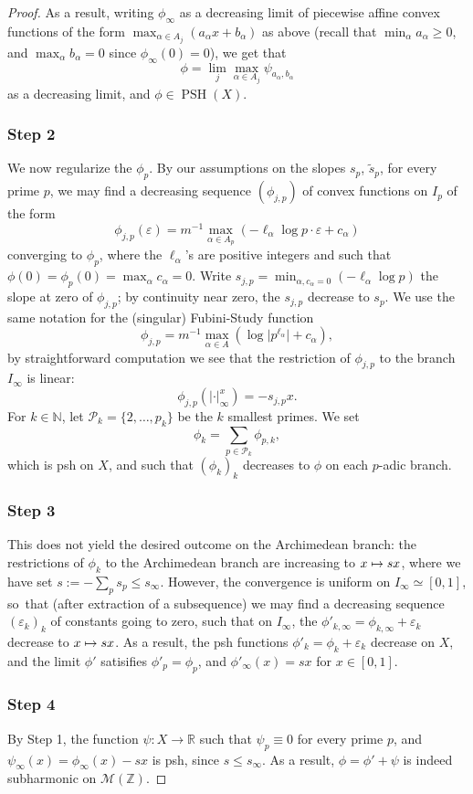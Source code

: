 \documentclass[JEP,XML,SOM,Unicode,published]{cedram}
\newcommand\mto{\mathchoice{\longmapsto}{\mapsto}{\mapsto}{\mapsto}}
\theoremstyle{definition}
\newcommand \N{\mathbb N}
\newcommand \R{\mathbb R}
\newcommand \Z{\mathbb Z}
\newcommand \M {\mathscr {M}}
\let\eps\varepsilon
\DeclareMathOperator{\PSH}{PSH}
\begin{document}
\begin{proof}
As a result, writing $\phi_{\infty}$ as a decreasing limit of piecewise affine convex functions of the form $\max_{\alpha \in A_j} (a_{\alpha} x +b_{\alpha})$ as above (recall that $\min_{\alpha} a_{\alpha} \ge 0$, and $\max_{\alpha} b_{\alpha} =0$ since $\phi_{\infty}(0)=0$), we get that
\[
\phi = \lim_j \max_{\alpha \in A_j} \psi_{a_{\alpha}, b_{\alpha}}
\]
as a decreasing limit, and $\phi \in \PSH(X)$.

\subsubsection*{Step 2} We now regularize the $\phi_p$. By our assumptions on the slopes $s_p$, $\tilde{s}_p$, for every prime $p$, we may find a decreasing sequence $(\phi_{j,p})$ of convex functions on $I_p$ of the form
\[
\phi_{j,p}(\eps) = m^{-1} \max_{\alpha \in A_p} (-\ell_{\alpha} \log p \cdot \eps +c_{\alpha})
\]
converging to $\phi_p$, where the $\ell_{\alpha}$'s are positive integers and such that $\phi(0) =\phi_p(0) = \max_{\alpha} c_{\alpha} =0$. Write $s_{j, p} = \min_{\alpha, c_{\alpha} =0} (-\ell_{\alpha} \log p)$ the slope at zero of $\phi_{j, p}$; by continuity near zero, the $s_{j, p}$ decrease to $s_p$. We use the same notation for the (singular) Fubini-Study function
\[
\phi_{j, p} =m^{-1} \max_{\alpha \in A} (\log \lvert p^{\ell_{\alpha}} \rvert +c_{\alpha}),
\]
by straightforward computation we see that the restriction of $\phi_{j, p}$ to the branch $I_{\infty}$ is linear:
\[
\phi_{j, p}(\lvert \cdot \rvert^x_{\infty}) = -s_{j, p} x.
\]
For $k \in \N$, let $\mathcal{P}_k =\{ 2,\dots,p_k \}$ be the $k$ smallest primes. We set
\[
\phi_{k} = \sum_{p \in \mathcal{P}_k} \phi_{p, k},
\]
which is psh on $X$, and such that $(\phi_k)_k$ decreases to $\phi$ on each $p$-adic branch.

\subsubsection*{Step 3} This does not yield the desired outcome on the Archimedean branch: the restrictions of $\phi_k$ to the Archimedean branch are increasing to $x \mto s x$, where we have set $s:= - \sum_{p} s_p \le s_{\infty}$. However, the convergence is uniform on $I_{\infty} \simeq [0,1]$, so~that (after extraction of a subsequence) we may find a decreasing sequence $(\eps_k)_k$ of constants going to zero, such that on $I_{\infty}$, the $\phi'_{k, \infty} = \phi_{k, \infty} + \eps_k$ decrease to $x \mto sx$. As a result, the psh functions $\phi'_k = \phi_k + \eps_k$ decrease on $X$, and the limit $\phi'$ satisifies $\phi'_p = \phi_p$, and $\phi'_{\infty}(x) = sx$ for $x \in [0,1]$.

\subsubsection*{Step 4} By Step 1, the function $\psi: X \to \R$ such that $\psi_p \equiv 0$ for every prime $p$, and $\psi_{\infty}(x) = \phi_{\infty}(x) - sx$ is psh, since $s\le s_{\infty}$. As a result, $\phi = \phi' + \psi$ is indeed subharmonic on $\M(\Z)$.
\end{proof}
\end{document}
